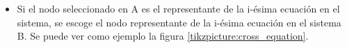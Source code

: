 \begin{itemize}
    \item Si el nodo seleccionado en A es el representante de la i-ésima ecuación en el sistema, se escoge el nodo representante de la i-ésima ecuación en el sistema B. Se puede ver como ejemplo la figura \ref{tikzpicture:cross_equation}.

          \begin{center}




\end{center}
\end{itemize}
